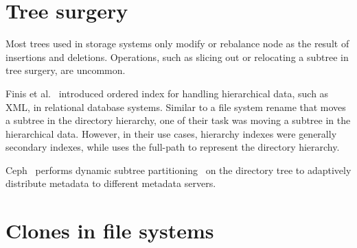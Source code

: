 \section{Tree surgery}

Most trees used in storage systems only modify or rebalance node as the result
of insertions and deletions.
Operations, such as slicing out or relocating a subtree in tree surgery,
are uncommon.

Finis et al.~\citep{orderindex} introduced ordered index for handling
hierarchical data, such as XML, in relational database systems.
Similar to a file system rename that moves a subtree in the directory hierarchy,
one of their task was moving a subtree in the hierarchical data.
However, in their use cases, hierarchy indexes were generally secondary
indexes,
while \betrfs uses the full-path to represent the directory hierarchy.

Ceph~\citep{ceph} performs dynamic subtree partitioning~\citep{cephtree} on the
directory tree to adaptively distribute metadata to different metadata servers.

\section{Clones in file systems}

